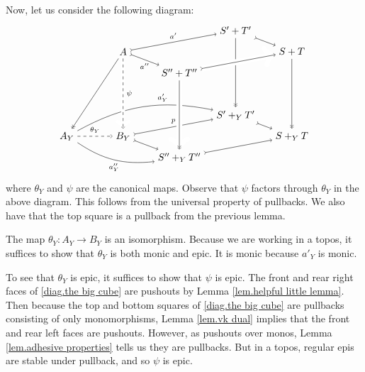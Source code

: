 \documentclass{tac}
\newcommand{\from}{\colon}
\begin{document}
Now, let us consider the following diagram:
	\begin{equation} \label{diag.the big cube}
		\begin{tikzpicture}
		\node (A) at (2,3) {$A$};
		\node (Ay) at (0,0) {$A_Y$};
		\node (By) at (2,0) {$B_Y$};
		\node (ST) at (8,3) {$S+T$};
		\node (ST') at (6,3.75) {$S'+T'$};
		\node (ST'') at (4,2.25) {$S''+T''$};
		\node (SYT) at (8,0) {$S+_YT$};
		\node (SYT') at (6,0.75) {$S'+_YT'$};
		\node (SYT'') at (4,-0.75) {$S''+_YT''$};
		\draw [->>] (A) edge (Ay);
		\draw [font=\scriptsize,>->] (A) edge node[below] {$a''$} (ST'');
		\draw [font=\scriptsize,>->] (A) edge node[above] {$a'$} (ST');
		\draw [font=\scriptsize,->] (Ay) edge[bend left=20,pos=0.65] node[above] {$a'_Y$} (SYT');
		\draw [font=\scriptsize,->] (Ay) edge[dashed] node[above] {$\theta_Y$} (By);
		\draw [font=\scriptsize,->] (Ay) edge[bend right=20] node[below] {$a''_Y$} (SYT'');
		\draw [font=\scriptsize,>->] (By) edge node[above] {$p$} (SYT');
		\draw [>->] (By) edge (SYT'');
		\draw [->>] (ST') edge (SYT');
		\draw [>->] (ST') edge (ST);
		\draw [>->] (ST'') edge (ST);
		\draw [->>] (ST) edge (SYT);
		\draw [>->] (SYT') edge (SYT);
		\draw [>->] (SYT'') edge (SYT);
		\draw [->] (A) edge[white,line width=4pt] (By);
		\draw [font=\scriptsize,->] (A) edge[dashed] node[right] {$\psi$} (By);
		\draw [->] (ST'') edge[white,line width=6pt] (ST);
		\draw [>->] (ST'') edge (ST);
		\draw [->] (ST'') edge[white,line width=6pt] (SYT'');
		\draw [->>] (ST'') edge (SYT'');
		\end{tikzpicture}
	\end{equation}
where $\theta_Y$ and $\psi$ are the canonical maps. 
Observe that $\psi$ factors through $\theta_Y$ in the above diagram.  
This follows from the universal property of pullbacks. 
We also have that the top square is a pullback from the previous lemma.

\lemma \label{lem.theta_Y iso}
	The map $ \theta_Y \from A_Y \to B_Y $ is an isomorphism.
\endlemma
\proof
	Because we are working in a topos, 
	it suffices to show that $\theta_Y$ is both monic and epic. 
	It is monic because $a'_Y$ is monic.
	
	To see that $\theta_Y$ is epic, 
	it suffices to show that $\psi$ is epic. 
	The front and rear right faces of 
		\eqref{diag.the big cube} 
	are pushouts by Lemma 
		\ref{lem.helpful little lemma}.  
	Then because the top and bottom squares of 
		\eqref{diag.the big cube} 
	are pullbacks consisting of only monomorphisms, 
	Lemma \ref{lem.vk dual} implies that the front 
	and rear left faces are pushouts.  
	However, as pushouts over monos, Lemma 
		\ref{lem.adhesive properties} 
	tells us they are pullbacks.  But in a topos, regular epis 
	are stable under pullback, and so $\psi$ is epic.  	
\endproof
\end{document}
